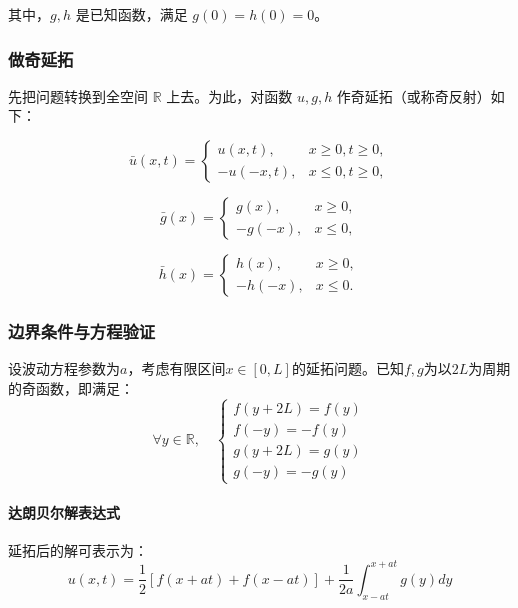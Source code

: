 \documentclass[12pt,a4paper]{article}
\numberwithin{subsection}{section}   %
\numberwithin{subsubsection}{subsection}
\theoremstyle{plain}
\theoremstyle{definition}
\theoremstyle{remark}
\theoremstyle{remark}
\begin{document}
	其中，\(g, h\) 是已知函数，满足 \(g(0) = h(0) = 0\)。
	
	\subsubsection{做奇延拓}
先把问题转换到全空间 \(\mathbb{R}\) 上去。为此，对函数 \(u, g, h\) 作奇延拓（或称奇反射）如下：
	
	\begin{equation}
		\bar{u}(x, t) = \begin{cases}
			u(x, t), & x \geq 0, t \geq 0, \\
			-u(-x, t), & x \leq 0, t \geq 0,
		\end{cases}
	\end{equation}
	
	\begin{equation}
		\bar{g}(x) = \begin{cases}
			g(x), & x \geq 0, \\
			-g(-x), & x \leq 0,
		\end{cases}
	\end{equation}
	
	\begin{equation}
		\bar{h}(x) = \begin{cases}
			h(x), & x \geq 0, \\
			-h(-x), & x \leq 0.
		\end{cases}
	\end{equation}
	
\subsubsection{边界条件与方程验证}
设波动方程参数为$a$，考虑有限区间$x \in [0, L]$的延拓问题。已知$f,g$为以$2L$为周期的奇函数，即满足：
\begin{equation}
	\forall y \in \mathbb{R},\quad 
	\begin{cases}
		f(y + 2L) = f(y) \\
		f(-y) = -f(y) \\
		g(y + 2L) = g(y) \\
		g(-y) = -g(y)
	\end{cases}
\end{equation}

\paragraph{达朗贝尔解表达式}
延拓后的解可表示为：
\begin{equation}
	u(x,t) = \frac{1}{2}[f(x + at) + f(x - at)] + \frac{1}{2a}\int_{x-at}^{x+at} g(y) dy
\end{equation}
\end{document}
